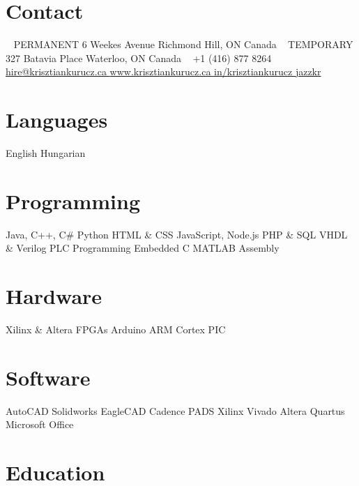 \documentclass[hidelinks]{kkurucz-cv}
\begin{document}


\begin{aside} %
\section{Contact}
~
{\headingfont PERMANENT}
6 Weekes Avenue
Richmond Hill, ON
Canada
~
{\headingfont TEMPORARY}
327 Batavia Place
Waterloo, ON
Canada
~
{+1 (416) 877 8264\hspace{1.5mm}\mobile}
~
\href{mailto:hire@krisztiankurucz.ca}{hire@krisztiankurucz.ca }\mail
\href{http://www.krisztiankurucz.ca}{www.krisztiankurucz.ca }\website
\href{http://ca.linkedin.com/in/krisztiankurucz}{in/krisztiankurucz }\linkedin
\href{http://www.github.com/jazzkr}{jazzkr }\github
\section{Languages}
English
Hungarian
\section{Programming}
Java, C++, C\#
Python
HTML \& CSS
JavaScript, Node.js
PHP \& SQL
VHDL \& Verilog
PLC Programming
Embedded C
MATLAB
Assembly
\section{Hardware}
Xilinx \& Altera FPGAs
Arduino
ARM Cortex
PIC
\section{Software}
AutoCAD
Solidworks
EagleCAD
Cadence
PADS
Xilinx Vivado
Altera Quartus
Microsoft Office
\end{aside}


\section{Education}
\end{document}
